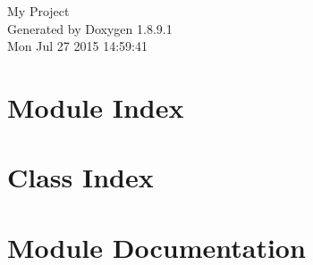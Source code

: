 \documentclass[twoside]{book}
\newcommand{\+}{\discretionary{\mbox{\scriptsize$\hookleftarrow$}}{}{}}
\newcommand{\clearemptydoublepage}{%
  \newpage{\pagestyle{empty}\cleardoublepage}%
}
\begin{document}
\hypersetup{pageanchor=false,
             bookmarks=true,
             bookmarksnumbered=true,
             pdfencoding=unicode
            }
\begin{titlepage}
\vspace*{7cm}
\begin{center}%
{\Large My Project }\\
\vspace*{1cm}
{\large Generated by Doxygen 1.8.9.1}\\
\vspace*{0.5cm}
{\small Mon Jul 27 2015 14:59:41}\\
\end{center}
\end{titlepage}
\clearemptydoublepage
\tableofcontents
\clearemptydoublepage
{}
\hypersetup{pageanchor=true}

\chapter{Module Index}

\chapter{Class Index}

\chapter{Module Documentation}

























\end{document}
